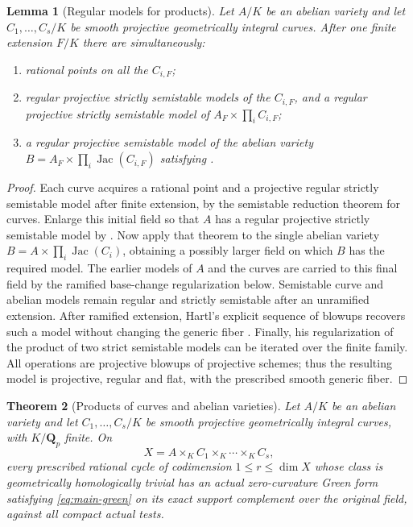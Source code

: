 \documentclass[11pt]{article}
\newtheorem{theorem}{Theorem}[section]
\newtheorem{lemma}[theorem]{Lemma}
\theoremstyle{definition}
\theoremstyle{remark}
\numberwithin{equation}{section}
\begin{document}
\begin{lemma}[Regular models for products]
\label{lem:product-model}
Let $A/K$ be an abelian variety and let $C_1,\ldots,C_s/K$
be smooth projective geometrically integral curves.  After
one finite extension $F/K$ there are simultaneously:
\begin{enumerate}
\item rational points on all the $C_{i,F}$;
\item regular projective strictly semistable models of the
  $C_{i,F}$, and a regular projective strictly semistable
  model of $A_F\times\prod_i C_{i,F}$;
\item a regular projective semistable model of the abelian
  variety $B=A_F\times\prod_i\operatorname{Jac}(C_{i,F})$
  satisfying .
\end{enumerate}
\end{lemma}

\begin{proof}
Each curve acquires a rational point and a projective regular
strictly semistable model after finite extension, by the
semistable reduction theorem for curves.  Enlarge this initial
field so that $A$ has a regular projective strictly semistable
model by .  Now apply that theorem to
the single abelian variety
$B=A\times\prod_i\operatorname{Jac}(C_i)$, obtaining a
possibly larger field on which $B$ has the required model.
The earlier models of $A$ and the curves are carried to this
final field by the ramified base-change regularization below.
Semistable
curve and abelian models remain regular and strictly semistable
after an unramified extension.  After ramified extension,
Hartl's explicit sequence of blowups recovers such a model
without changing the generic fiber
\cite[Proposition~2.2]{Hartl}.  Finally, his regularization of
the product of two strict semistable models
\cite[Proposition~2.1]{Hartl} can be iterated over the finite
family.  All operations are projective blowups of projective
schemes; thus the resulting model is projective, regular and
flat, with the prescribed smooth generic fiber.
\end{proof}

\begin{theorem}[Products of curves and abelian varieties]
\label{thm:curve-products-G}
Let $A/K$ be an abelian variety and let $C_1,\ldots,C_s/K$
be smooth projective geometrically integral curves, with
$K/\mathbf Q_p$ finite.  On
\[
                       X=A\times_K C_1\times_K\cdots\times_K C_s,
\]
every prescribed rational cycle of codimension
$1\le r\le\dim X$ whose class is geometrically homologically
trivial has an actual zero-curvature Green form satisfying
\eqref{eq:main-green} on its exact support complement over the
original field, against all compact actual tests.
\end{theorem}
\end{document}
